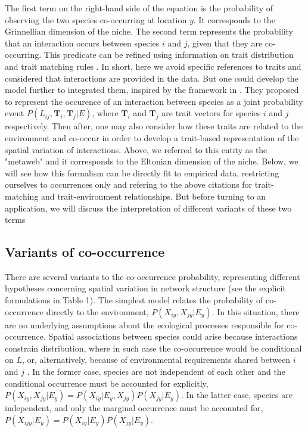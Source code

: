 \documentclass[12pt]{article}
\begin{document}
The first term on the right-hand side of the equation is the probability of
observing the two species co-occurring at location $y$. It corresponds to the
Grinnellian dimension of the niche. The second term represents the probability
that an interaction occurs between species $i$ and $j$, given that they are
co-occurring. This predicate can be refined using information on trait
distribution and trait matching rules \citep{Bartomeus2016}. In short, here we
avoid specific references to traits and considered that interactions are
provided in the data. But one could develop the model further to integrated
them, inspired by the framework in \citealt{Gravel2016}. They proposed to
represent the occurence of an interaction between species as a joint
probability event $P(L_{ij}, \mathbf{T}_i, \mathbf{T}_j|E)$, where
$\mathbf{T}_i$ and $\mathbf{T}_j$ are trait vectors for species $i$ and $j$
respectively. Then after, one may also consider how these traits are related
to the environment and co-occur in order to develop a trait-based
representation of the spatial variation of interactions. Above, we referred to
this entity as the "metaweb" and it corresponds to the Eltonian dimension of
the niche. Below, we will see how this formalism can be directly fit to
empirical data, restricting ourselves to occurrences only and refering to the
above citations for trait-matching and trait-environment relationships. But
before turning to an application, we will discuss the interpretation of
different variants of these two terms

\subsection*{Variants of co-occurrence}

There are several variants to the co-occurrence probability, representing
different hypotheses concerning spatial variation in network structure (see
the explicit formulations in Table 1). The simplest model relates the
probability of co-occurrence directly to the environment,
$P(X_{iy},X_{jy}|E_y)$. In this situation, there are no underlying assumptions
about the ecological processes responsible for co-occurrence. Spatial associations between species could arise
because interactions constrain distribution, where in such case the co-occurrence would be conditional on $L$, or, alternatively, because of
environmental requirements shared between $i$ and $j$ \citep{Pollock2014,
Cazelles2016}. In the former case, species are not independent of each other
and the conditional occurrence must be accounted for explicitly,
$P(X_{iy},X_{jy} |E_y)=P(X_{iy}|E_y,X_{jy})P(X_{jy}|E_y)$. In the latter case,
species are independent, and only the marginal occurrence must be accounted
for, $P( X_{ijy}|E_y)=P(X_{iy} |E_y)P(X_{jy} |E_y)$.
\end{document}
